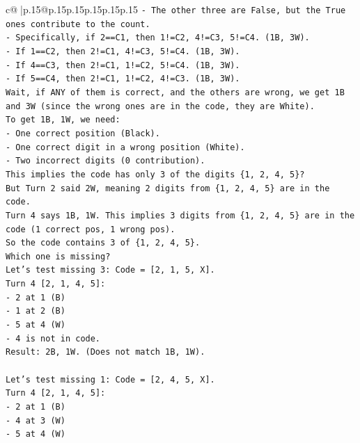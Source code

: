 \documentclass{article}
\begin{document}
{\begin{supertabular}{c@{$\;$}|p{.15\linewidth}@{}p{.15\linewidth}p{.15\linewidth}p{.15\linewidth}p{.15\linewidth}p{.15\linewidth}}
{{{\texttt{{-} The other three are False, but the True ones contribute to the count.} \\
\texttt{{-} Specifically, if 2==C1, then 1!=C2, 4!=C3, 5!=C4. (1B, 3W).} \\
\texttt{{-} If 1==C2, then 2!=C1, 4!=C3, 5!=C4. (1B, 3W).} \\
\texttt{{-} If 4==C3, then 2!=C1, 1!=C2, 5!=C4. (1B, 3W).} \\
\texttt{{-} If 5==C4, then 2!=C1, 1!=C2, 4!=C3. (1B, 3W).} \\
\texttt{Wait, if ANY of them is correct, and the others are wrong, we get 1B and 3W (since the wrong ones are in the code, they are White).} \\
\texttt{To get 1B, 1W, we need:} \\
\texttt{{-} One correct position (Black).} \\
\texttt{{-} One correct digit in a wrong position (White).} \\
\texttt{{-} Two incorrect digits (0 contribution).} \\
\texttt{This implies the code has only 3 of the digits \{1, 2, 4, 5\}?} \\
\texttt{But Turn 2 said 2W, meaning 2 digits from \{1, 2, 4, 5\} are in the code.} \\
\texttt{Turn 4 says 1B, 1W. This implies 3 digits from \{1, 2, 4, 5\} are in the code (1 correct pos, 1 wrong pos).} \\
\texttt{So the code contains 3 of \{1, 2, 4, 5\}.} \\
\texttt{Which one is missing?} \\
\texttt{Let's test missing 3: Code = {[}2, 1, 5, X{]}.} \\
\texttt{Turn 4 {[}2, 1, 4, 5{]}:} \\
\texttt{{-} 2 at 1 (B)} \\
\texttt{{-} 1 at 2 (B)} \\
\texttt{{-} 5 at 4 (W)} \\
\texttt{{-} 4 is not in code.} \\
\texttt{Result: 2B, 1W. (Does not match 1B, 1W).} \\
\\ 
\texttt{Let's test missing 1: Code = {[}2, 4, 5, X{]}.} \\
\texttt{Turn 4 {[}2, 1, 4, 5{]}:} \\
\texttt{{-} 2 at 1 (B)} \\
\texttt{{-} 4 at 3 (W)} \\
\texttt{{-} 5 at 4 (W)} \\
}}}
\end{supertabular}}
\end{document}
